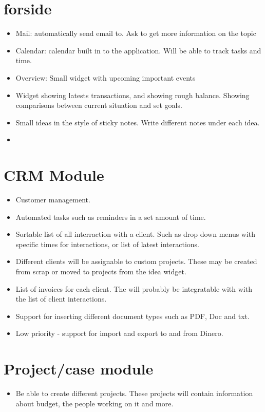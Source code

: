 \section{forside}
\begin{itemize}
	\item Mail: automatically send email to. Ask to get more information on the topic
	\item Calendar: calendar built in to the application. Will be able to track tasks and time.
	\item Overview: Small widget with upcoming important events
	\item Widget showing latests transactions, and showing rough balance. Showing comparisons between current situation and set goals.
	\item Small ideas in the style of sticky notes. Write different notes under each idea.
	\item 
\end{itemize}

\section{CRM Module}
\begin{itemize}
	\item Customer management.
	\item Automated tasks such as reminders in a set amount of time. 
	\item Sortable list of all interraction with a client. Such as drop down menus with specific times for interactions, or list of latest interactions.
	\item Different clients will be assignable to custom projects. These may be created from scrap or moved to projects from the idea widget.
	\item List of invoices for each client. The will probably be integratable with with the list of client interactions.
	\item Support for inserting different document types such as PDF, Doc and txt.
	\item Low priority - support for import and export to and from Dinero. 
\end{itemize}

\section{Project/case module}
\begin{itemize}
	\item Be able to create different projects. These projects will contain information about budget, the people working on it and more.
\end{itemize}

